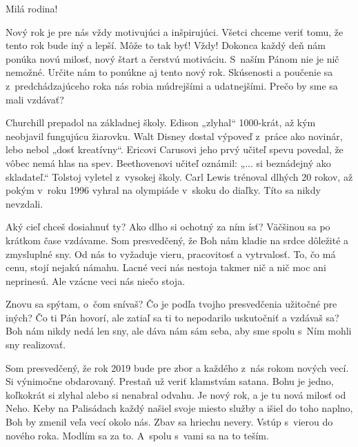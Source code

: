 


Milá rodina!

Nový rok je pre nás vždy motivujúci a inšpirujúci. Všetci chceme veriť tomu, že tento rok bude iný a lepší. Môže to tak byť! Vždy! Dokonca každý deň nám ponúka novú milosť, nový štart a čerstvú motiváciu. S~naším Pánom nie je nič nemožné. Určite nám to ponúkne aj tento nový rok. Skúsenosti a poučenie sa z~predchádzajúceho roka nás robia múdrejšími a udatnejšími. Prečo by sme sa mali vzdávať?

Churchill prepadol na základnej školy. Edison „zlyhal“ 1000-krát, až kým neobjavil fungujúcu žiarovku. Walt Disney dostal výpoveď z~práce ako novinár, lebo nebol „dosť kreatívny“. Ericovi Carusovi jeho prvý učiteľ spevu povedal, že vôbec nemá hlas na spev. Beethovenovi učiteľ oznámil: „... si beznádejný ako skladateľ.“ Tolstoj vyletel z~vysokej školy. Carl Lewis trénoval dlhých 20 rokov, až pokým v~roku 1996 vyhral na olympiáde v~skoku do diaľky. Títo sa nikdy nevzdali.

Aký cieľ chceš dosiahnuť ty? Ako dlho si ochotný za ním ísť? Väčšinou sa po krátkom čase vzdávame. Som presvedčený, že Boh nám kladie na srdce dôležité a zmysluplné sny. Od nás to vyžaduje vieru, pracovitosť a vytrvalosť. To, čo má cenu, stojí nejakú námahu. Lacné veci nás nestoja takmer nič a nič moc ani neprinesú. Ale vzácne veci nás niečo stoja.

Znovu sa spýtam, o~čom snívaš? Čo je podľa tvojho presvedčenia užitočné pre iných? Čo ti Pán hovorí, ale zatiaľ sa ti to nepodarilo uskutočniť a vzdávaš sa? Boh nám nikdy nedá len sny, ale dáva nám sám seba, aby sme spolu s~Ním mohli sny realizovať.

Som presvedčený, že rok 2019 bude pre zbor a každého z~nás rokom nových vecí. Si výnimočne obdarovaný. Prestaň už veriť klamstvám satana. Bohu je jedno, koľkokrát si zlyhal alebo si nenabral odvahu. Je nový rok, a je tu nová milosť od Neho. Keby na Palisádach každý našiel svoje miesto služby a išiel do toho naplno, Boh by zmenil veľa vecí okolo nás. Zbav sa hriechu nevery. Vstúp s~vierou do nového roka. Modlím sa za to. A~spolu s~vami sa na to teším.



